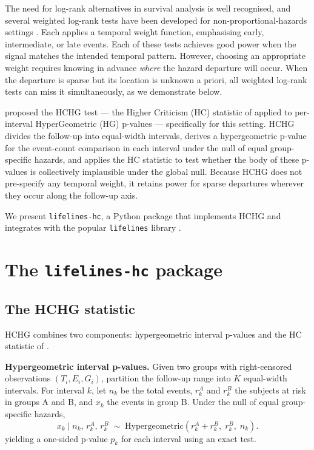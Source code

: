 \documentclass[unnumsec,webpdf,contemporary,large]{oup-authoring-template}
\begin{document}
The need for log-rank alternatives in survival analysis is well recognised,
and several weighted log-rank tests have been developed for non-proportional-hazards
settings \citep{gehan1965,peto1972,taroneware1977,flemingharrington1991}.
Each applies a temporal weight function, emphasising early, intermediate,
or late events. Each of these tests achieves good power when the signal matches the intended temporal pattern. However, choosing an appropriate weight requires knowing in advance \emph{where} the hazard departure will occur. When the departure is sparse but its location is unknown a priori, all weighted log-rank tests can miss it simultaneously, as we demonstrate below.

\citet{kipnis_biometrika} proposed the HCHG test — the Higher Criticism
(HC) statistic of \citet{donoho2004} applied to per-interval
HyperGeometric (HG) p-values — specifically for this setting. HCHG
divides the follow-up into equal-width intervals, derives a hypergeometric
p-value for the event-count comparison in each interval under the null of
equal group-specific hazards, and applies the HC statistic to test whether
the body of these p-values is collectively implausible
under the global null. Because HCHG does not pre-specify any temporal
weight, it retains power for sparse departures wherever they occur along
the follow-up axis.

We present \texttt{lifelines-hc}, a Python package that implements HCHG and integrates with the popular \texttt{lifelines} library \citep{davidsonpilon2019}.


\section{The \texttt{lifelines-hc} package}

\subsection*{The HCHG statistic}

HCHG \citep{kipnis_biometrika} combines two components: hypergeometric
interval p-values and the HC statistic of \citet{donoho2004,donoho2015special}.

\textbf{Hypergeometric interval p-values.}
Given two groups with right-censored observations $(T_i, E_i, G_i)$,
partition the follow-up range into $K$ equal-width intervals. For
interval $k$, let $n_k$ be the total events, $r_k^A$ and $r_k^B$ the
subjects at risk in groups A and B, and $x_k$ the events in group B.
Under the null of equal group-specific hazards,
%
\begin{equation}\label{eq:hypergeom}
  x_k \;\Big|\; n_k,\, r_k^A,\, r_k^B
  \;\sim\;
  \mathrm{Hypergeometric}\!\left(r_k^A + r_k^B,\; r_k^B,\; n_k\right).
\end{equation}
%
yielding a one-sided p-value $p_k$ for each interval using an exact test.
\end{document}
